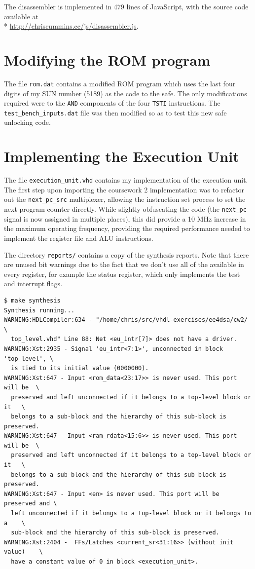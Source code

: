 \documentclass[12pt,a4paper]{article}
\begin{document}
The disassembler is implemented in 479 lines of JavaScript, with the
source code available at\\*
\url{http://chriscummins.cc/js/disassembler.js}.

\section{Modifying the ROM program}

The file \texttt{rom.dat} contains a modified ROM program which uses
the last four digits of my SUN number (5189) as the code to the
safe. The only modifications required were to the \texttt{AND}
components of the four \texttt{TSTI} instructions. The
\texttt{test\_bench\_inputs.dat} file was then modified so as to test
this new safe unlocking code.

\section{Implementing the Execution Unit}

The file \texttt{execution\_unit.vhd} contains my implementation of
the execution unit. The first step upon importing the coursework 2
implementation was to refactor out the \texttt{next\_pc\_src}
multiplexer, allowing the instruction set process to set the next
program counter directly. While slightly obfuscating the code (the
\texttt{next\_pc} signal is now assigned in multiple places), this did
provide a 10 MHz increase in the maximum operating frequency,
providing the required performance needed to implement the register
file and ALU instructions.

The directory \texttt{reports/} contains a copy of the synthesis
reports. Note that there are unused bit warnings due to the fact that
we don't use all of the available in every register, for example the
status register, which only implements the test and interrupt flags.

\begin{verbatim}
$ make synthesis
Synthesis running...
WARNING:HDLCompiler:634 - "/home/chris/src/vhdl-exercises/ee4dsa/cw2/       \
  top_level.vhd" Line 88: Net <eu_intr[7]> does not have a driver.
WARNING:Xst:2935 - Signal 'eu_intr<7:1>', unconnected in block 'top_level', \
  is tied to its initial value (0000000).
WARNING:Xst:647 - Input <rom_data<23:17>> is never used. This port will be  \
  preserved and left unconnected if it belongs to a top-level block or it   \
  belongs to a sub-block and the hierarchy of this sub-block is preserved.
WARNING:Xst:647 - Input <ram_rdata<15:6>> is never used. This port will be  \
  preserved and left unconnected if it belongs to a top-level block or it   \
  belongs to a sub-block and the hierarchy of this sub-block is preserved.
WARNING:Xst:647 - Input <en> is never used. This port will be preserved and \
  left unconnected if it belongs to a top-level block or it belongs to a    \
  sub-block and the hierarchy of this sub-block is preserved.
WARNING:Xst:2404 -  FFs/Latches <current_sr<31:16>> (without init value)    \
  have a constant value of 0 in block <execution_unit>.
\end{verbatim}
\end{document}
